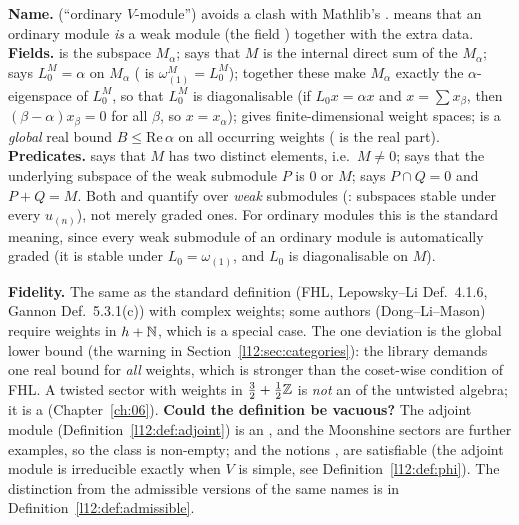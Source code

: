 \begin{dictionary}
\textbf{Name.}  (``ordinary $V$-module'') avoids a clash with Mathlib's . 
means that an ordinary module \emph{is} a weak module (the field ) together with the extra data.
\textbf{Fields.}  is the subspace $M_\alpha$;  says that $M$ is the internal direct sum of the
$M_\alpha$;  says $L_0^M=\alpha$ on $M_\alpha$ ( is $\omega^M_{(1)} = L^M_0$); together these make
$M_\alpha$ exactly the $\alpha$-eigenspace of $L^M_0$, so that $L_0^M$ is diagonalisable (if $L_0x=\alpha x$ and
$x=\sum x_\beta$, then $(\beta-\alpha)x_\beta=0$ for all $\beta$, so $x=x_\alpha$);  gives finite-dimensional weight
spaces;  is a \emph{global} real bound $B\le\mathrm{Re}\,\alpha$ on all occurring weights ( is the real
part). \textbf{Predicates.}  says that $M$ has two distinct elements, i.e.\ $M\neq0$;  says that the underlying subspace of the weak submodule $P$ is $0$ or $M$;  says
$P\cap Q = 0$ and $P+Q = M$. Both  and  quantify over \emph{weak} submodules
(: subspaces stable under every $u_{(n)}$), not merely graded ones. For ordinary modules this is the
standard meaning, since every weak submodule of an ordinary module is automatically graded (it is stable under $L_0=\omega_{(1)}$, and
$L_0$ is diagonalisable on $M$).

\textbf{Fidelity.} The same as the standard definition (FHL, Lepowsky--Li Def.~4.1.6, Gannon Def.~5.3.1(c)) with complex weights; some authors (Dong--Li--Mason) require weights in $h+{\mathbb{N}}$,
which is a special case. The one deviation is the global lower bound (the warning in Section~\ref{l12:sec:categories}): the library demands one real
bound for \emph{all} weights, which is stronger than the coset-wise condition of FHL. A twisted sector with weights in
$\tfrac32+\tfrac12{\mathbb{Z}}$ is \emph{not} an  of the untwisted algebra; it is a  (Chapter~\ref{ch:06}).
\textbf{Could the definition be vacuous?} The adjoint module (Definition~\ref{l12:def:adjoint}) is an , and the
Moonshine sectors are further examples, so the class is non-empty; and the notions ,
 are satisfiable (the adjoint module is irreducible exactly when $V$ is simple, see Definition~\ref{l12:def:phi}). The distinction from the admissible versions of the same names is in Definition~\ref{l12:def:admissible}.
\end{dictionary}

